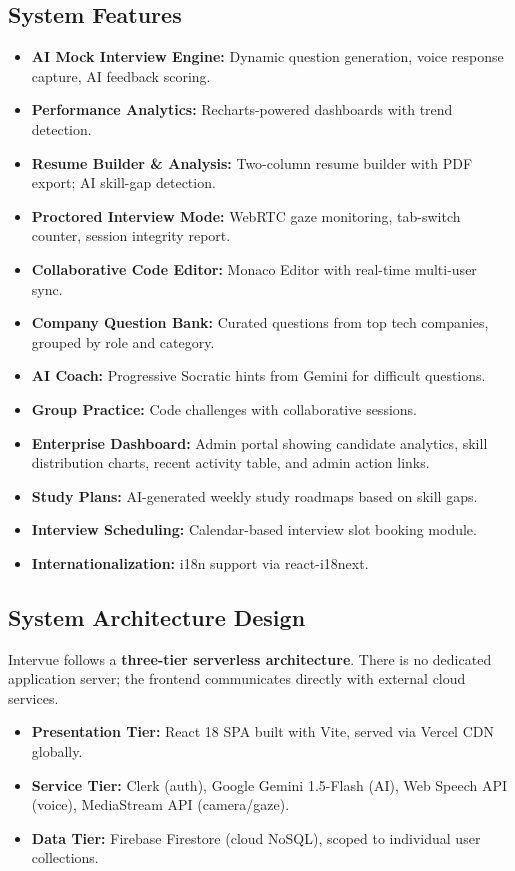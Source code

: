 \documentclass{fisatprojectfinal}
\begin{document}
\subsection{System Features}
\begin{itemize}
  \item \textbf{AI Mock Interview Engine:} Dynamic question generation, voice response
        capture, AI feedback scoring.
  \item \textbf{Performance Analytics:} Recharts-powered dashboards with trend detection.
  \item \textbf{Resume Builder \& Analysis:} Two-column resume builder with PDF export;
        AI skill-gap detection.
  \item \textbf{Proctored Interview Mode:} WebRTC gaze monitoring, tab-switch counter,
        session integrity report.
  \item \textbf{Collaborative Code Editor:} Monaco Editor with real-time multi-user sync.
  \item \textbf{Company Question Bank:} Curated questions from top tech companies, grouped
        by role and category.
  \item \textbf{AI Coach:} Progressive Socratic hints from Gemini for difficult questions.
  \item \textbf{Group Practice:} Code challenges with collaborative sessions.
  \item \textbf{Enterprise Dashboard:} Admin portal showing candidate analytics, skill
        distribution charts, recent activity table, and admin action links.
  \item \textbf{Study Plans:} AI-generated weekly study roadmaps based on skill gaps.
  \item \textbf{Interview Scheduling:} Calendar-based interview slot booking module.
  \item \textbf{Internationalization:} i18n support via react-i18next.
\end{itemize}

\subsection{System Architecture Design}
Intervue follows a \textbf{three-tier serverless architecture}. There is no dedicated
application server; the frontend communicates directly with external cloud services.

\begin{itemize}
  \item \textbf{Presentation Tier:} React 18 SPA built with Vite, served via Vercel CDN
        globally.
  \item \textbf{Service Tier:} Clerk (auth), Google Gemini 1.5-Flash (AI), Web Speech API
        (voice), MediaStream API (camera/gaze).
  \item \textbf{Data Tier:} Firebase Firestore (cloud NoSQL), scoped to individual user
        collections.
\end{itemize}
\end{document}
